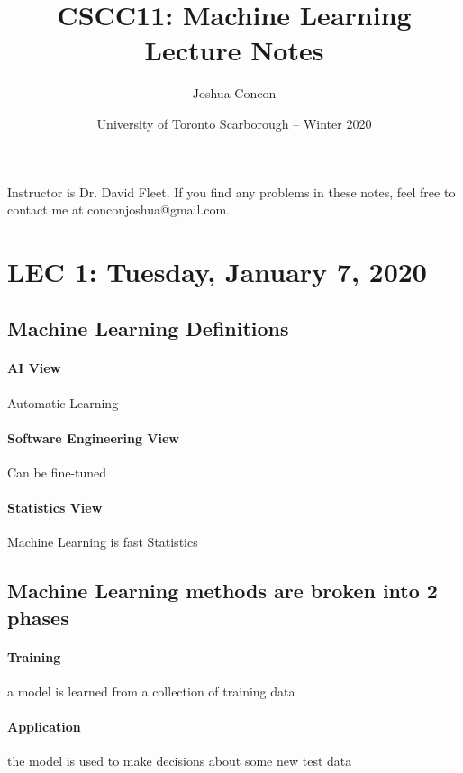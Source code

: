 \documentclass[12pt]{article}
\begin{document}
\title{CSCC11: Machine Learning\\ Lecture Notes}
\date{University of Toronto Scarborough -- Winter 2020}
\author{Joshua Concon}
\maketitle
Instructor is Dr. David Fleet. If you find any problems in these notes, feel free to contact me at conconjoshua@gmail.com.

\tableofcontents

\pagebreak

\section{LEC 1: Tuesday, January 7, 2020}

\subsection{Machine Learning Definitions}

\paragraph{AI View} Automatic Learning
\paragraph{Software Engineering View} Can be fine-tuned
\paragraph{Statistics View} Machine Learning is fast Statistics

\subsection*{Machine Learning methods are broken into 2 phases}
\paragraph{Training} a model is learned from a collection of training data
\paragraph{Application} the model is used to make decisions about some new test data
\end{document}
